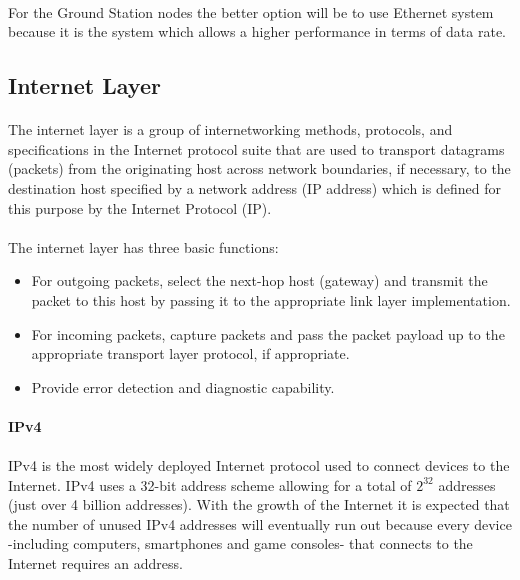 \paragraph{}
For the Ground Station nodes the better option will be to use Ethernet system because it is the system which allows a higher performance in terms of data rate.


\subsection{Internet Layer}
\paragraph{}
The internet layer is a group of internetworking methods, protocols, and specifications in the Internet protocol suite that are used to transport datagrams (packets) from the originating host across network boundaries, if necessary, to the destination host specified by a network address (IP address) which is defined for this purpose by the Internet Protocol (IP). 
\paragraph{}
The internet layer has three basic functions:
\begin{itemize}
\item For outgoing packets, select the next-hop host (gateway) and transmit the packet to this host by passing it to the appropriate link layer implementation.
\item For incoming packets, capture packets and pass the packet payload up to the appropriate transport layer protocol, if appropriate.
\item Provide error detection and diagnostic capability.
\end{itemize}

\paragraph{} \textbf{IPv4}
\paragraph{}
IPv4 is the most widely deployed Internet protocol used to connect devices to the Internet. IPv4 uses a 32-bit address scheme allowing for a total of $ 2^{32} $ addresses (just over 4 billion addresses).  With the growth of the Internet it is expected that the number of unused IPv4 addresses will eventually run out because every device -including computers, smartphones and game consoles- that connects to the Internet requires an address.

